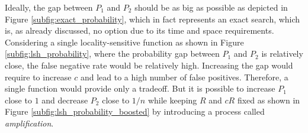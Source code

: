 Ideally, the gap between $P_1$ and $P_2$ should be as big as possible as depicted in Figure \ref{subfig:exact_probability}, which in fact represents an exact search, which is, as already discussed, no option due to its time and space requirements. Considering a single locality-sensitive function as shown in Figure \ref{subfig:lsh_probability}, where the probability gap between $P_1$ and $P_2$ is relatively close, the false negative rate would be relatively high. Increasing the gap would require to increase $c$ and lead to a high number of false positives. Therefore, a single function would provide only a tradeoff. But it is possible to increase $P_1$ close to $1$ and decrease $P_2$ close to $1/n$ while keeping $R$ and $cR$ fixed as shown in Figure \ref{subfig:lsh_probability_boosted} by introducing a process called \textit{amplification}.

